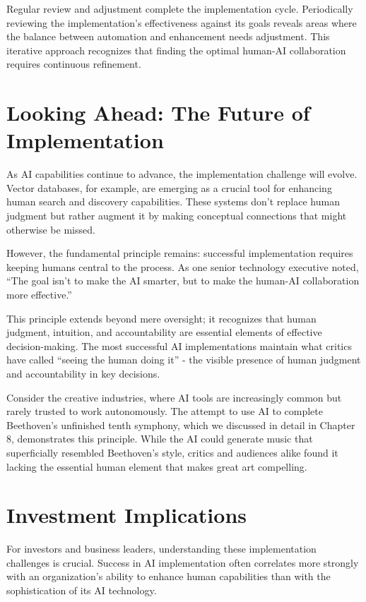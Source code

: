 \documentclass[
  Letterpaper,
]{scrbook}
\begin{document}
Regular review and adjustment complete the implementation cycle.
Periodically reviewing the implementation's effectiveness against its
goals reveals areas where the balance between automation and enhancement
needs adjustment. This iterative approach recognizes that finding the
optimal human-AI collaboration requires continuous refinement.

\section{Looking Ahead: The Future of
Implementation}\label{looking-ahead-the-future-of-implementation}

As AI capabilities continue to advance, the implementation challenge
will evolve. Vector databases, for example, are emerging as a crucial
tool for enhancing human search and discovery capabilities. These
systems don't replace human judgment but rather augment it by making
conceptual connections that might otherwise be missed.

However, the fundamental principle remains: successful implementation
requires keeping humans central to the process. As one senior technology
executive noted, ``The goal isn't to make the AI smarter, but to make
the human-AI collaboration more effective.''

This principle extends beyond mere oversight; it recognizes that human
judgment, intuition, and accountability are essential elements of
effective decision-making. The most successful AI implementations
maintain what critics have called ``seeing the human doing it'' - the
visible presence of human judgment and accountability in key decisions.

Consider the creative industries, where AI tools are increasingly common
but rarely trusted to work autonomously. The attempt to use AI to
complete Beethoven's unfinished tenth symphony, which we discussed in
detail in Chapter 8, demonstrates this principle. While the AI could
generate music that superficially resembled Beethoven's style, critics
and audiences alike found it lacking the essential human element that
makes great art compelling.

\section{Investment Implications}\label{investment-implications-3}

For investors and business leaders, understanding these implementation
challenges is crucial. Success in AI implementation often correlates
more strongly with an organization's ability to enhance human
capabilities than with the sophistication of its AI technology.
\end{document}

